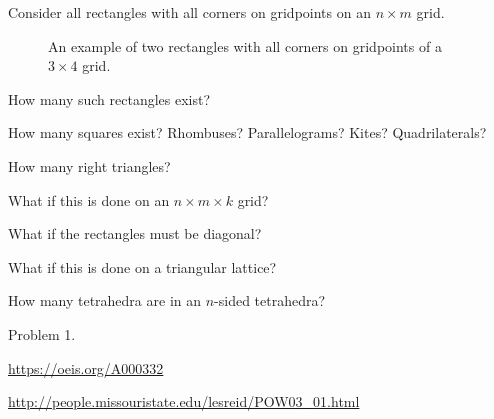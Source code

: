\documentclass{article}
\begin{document}
Consider all rectangles with all corners on gridpoints on an $n \times m$ grid.
\begin{figure}[!h]
  \centering
  \caption{
    An example of two rectangles with all corners on gridpoints of a
    $3 \times 4$ grid.
  }
\end{figure}

\begin{question}
  How many such rectangles exist?
\end{question}
\begin{related}
  \item How many squares exist? Rhombuses? Parallelograms? Kites? Quadrilaterals?
  \item How many right triangles?
  \item What if this is done on an $n \times m \times k$ grid?
  \item What if the rectangles must be diagonal?
  \item What if this is done on a triangular lattice?
  \item How many tetrahedra are in an $n$-sided tetrahedra?
\end{related}
\begin{references}
  \item Problem 1.
  \item \url{https://oeis.org/A000332}
  \item \url{http://people.missouristate.edu/lesreid/POW03_01.html}
\end{references}
\end{document}
